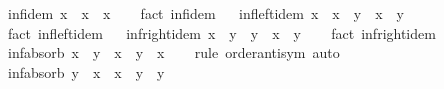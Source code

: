 \begin{isabellebody}
\endisatagproof
{\isafoldproof}%
%
\isadelimproof
\isanewline
%
\endisadelimproof
\isanewline
{}\isamarkupfalse%
\ inf{\isacharunderscore}{\kern0pt}idem{\isacharcolon}{\kern0pt}\ {\isachardoublequoteopen}x\ {\isasymsqinter}\ x\ {\isacharequal}{\kern0pt}\ x{\isachardoublequoteclose}\isanewline
%
\isadelimproof
\ \ %
\endisadelimproof
%
\isatagproof
{}\isamarkupfalse%
\ {\isacharparenleft}{\kern0pt}fact\ inf{\isachardot}{\kern0pt}idem{\isacharparenright}{\kern0pt}%
\endisatagproof
{\isafoldproof}%
%
\isadelimproof
%
\endisadelimproof
\ \isanewline
\isanewline
{}\isamarkupfalse%
\ inf{\isacharunderscore}{\kern0pt}left{\isacharunderscore}{\kern0pt}idem{\isacharcolon}{\kern0pt}\ {\isachardoublequoteopen}x\ {\isasymsqinter}\ {\isacharparenleft}{\kern0pt}x\ {\isasymsqinter}\ y{\isacharparenright}{\kern0pt}\ {\isacharequal}{\kern0pt}\ x\ {\isasymsqinter}\ y{\isachardoublequoteclose}\isanewline
%
\isadelimproof
\ \ %
\endisadelimproof
%
\isatagproof
{}\isamarkupfalse%
\ {\isacharparenleft}{\kern0pt}fact\ inf{\isachardot}{\kern0pt}left{\isacharunderscore}{\kern0pt}idem{\isacharparenright}{\kern0pt}%
\endisatagproof
{\isafoldproof}%
%
\isadelimproof
%
\endisadelimproof
\ \isanewline
\isanewline
{}\isamarkupfalse%
\ inf{\isacharunderscore}{\kern0pt}right{\isacharunderscore}{\kern0pt}idem{\isacharcolon}{\kern0pt}\ {\isachardoublequoteopen}{\isacharparenleft}{\kern0pt}x\ {\isasymsqinter}\ y{\isacharparenright}{\kern0pt}\ {\isasymsqinter}\ y\ {\isacharequal}{\kern0pt}\ x\ {\isasymsqinter}\ y{\isachardoublequoteclose}\isanewline
%
\isadelimproof
\ \ %
\endisadelimproof
%
\isatagproof
{}\isamarkupfalse%
\ {\isacharparenleft}{\kern0pt}fact\ inf{\isachardot}{\kern0pt}right{\isacharunderscore}{\kern0pt}idem{\isacharparenright}{\kern0pt}%
\endisatagproof
{\isafoldproof}%
%
\isadelimproof
%
\endisadelimproof
\ \isanewline
\isanewline
{}\isamarkupfalse%
\ inf{\isacharunderscore}{\kern0pt}absorb{}{\isacharcolon}{\kern0pt}\ {\isachardoublequoteopen}x\ {\isasymle}\ y\ {\isasymLongrightarrow}\ x\ {\isasymsqinter}\ y\ {\isacharequal}{\kern0pt}\ x{\isachardoublequoteclose}\isanewline
%
\isadelimproof
\ \ %
\endisadelimproof
%
\isatagproof
{}\isamarkupfalse%
\ {\isacharparenleft}{\kern0pt}rule\ order{\isachardot}{\kern0pt}antisym{\isacharparenright}{\kern0pt}\ auto%
\endisatagproof
{\isafoldproof}%
%
\isadelimproof
\isanewline
%
\endisadelimproof
\isanewline
{}\isamarkupfalse%
\ inf{\isacharunderscore}{\kern0pt}absorb{}{\isacharcolon}{\kern0pt}\ {\isachardoublequoteopen}y\ {\isasymle}\ x\ {\isasymLongrightarrow}\ x\ {\isasymsqinter}\ y\ {\isacharequal}{\kern0pt}\ y{\isachardoublequoteclose}\isanewline

\end{isabellebody}
